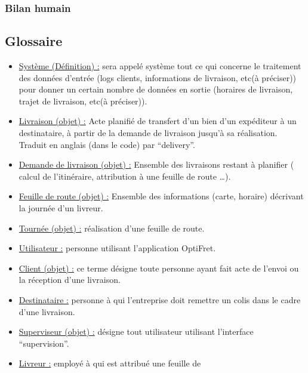 \documentclass[a4paper]{report}
\begin{document}
\subsection{Bilan humain}


\begin{appendices}
    \chapter{Glossaire}

    \begin{itemize}[label = \textbullet, font = \color{orange}]
        \item \underline{Système (Définition) :} sera appelé système tout ce
            qui concerne le traitement des données d’entrée (logs clients,
            informations de livraison, etc(à préciser)) pour donner un certain
            nombre de données en sortie (horaires de livraison, trajet de
            livraison, etc(à préciser)).
        \item \underline{Livraison (objet) :} Acte planifié de transfert d’un
            bien d’un expéditeur à un destinataire, à partir de la demande de
            livraison  jusqu’à sa réalisation. Traduit en anglais (dans le
            code) par “delivery”.
        \item \underline{Demande de livraison (objet) :} Ensemble des
            livraisons restant à planifier ( calcul de l’itinéraire,
            attribution à une feuille de route …). 
        \item \underline{Feuille de route (objet) :} Ensemble des informations
            (carte, horaire) décrivant la journée d’un livreur.
        \item \underline{Tournée (objet) :} réalisation d’une feuille de route.
        \item \underline{Utilisateur :} personne utilisant l’application
            OptiFret. 
        \item \underline{Client (objet) :}  ce terme désigne toute personne
            ayant fait acte de l’envoi ou la réception d’une livraison. 
        \item \underline{Destinataire :} personne à qui l’entreprise doit
            remettre un colis dans le cadre d’une livraison.
        \item \underline{Superviseur (objet) :} désigne tout utilisateur
            utilisant l’interface “supervision”.
        \item \underline{Livreur :} employé à qui est attribué une feuille de

\end{itemize}
\end{appendices}
\end{document}
